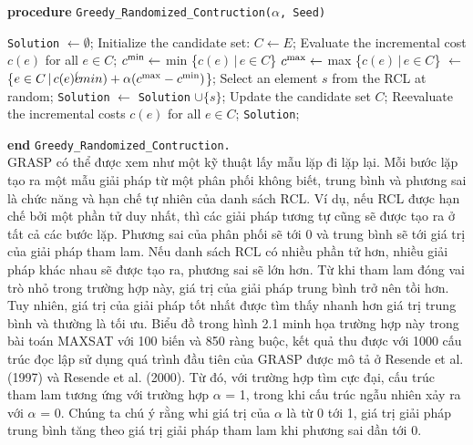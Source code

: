 \documentclass[14pt,a4paper]{report}
\begin{document}
{\bf procedure} \texttt{Greedy\_Randomized\_Contruction($\alpha$, Seed)}
\begin{algorithmic} [1] 
	\STATE \texttt{Solution} $\leftarrow \emptyset$;
	\STATE Initialize the candidate set: $C \leftarrow E$;
	\STATE Evaluate the incremental cost $c(e)$ for all $e \in C$;
	\STATE $c\textsuperscript{min} \leftarrow $ min \{$c(e)\,|\, e \in C$\}
	\STATE $c\textsuperscript{max} \leftarrow $ max \{$c(e)\,|\, e \in C$\}
	 $\leftarrow$ \{$e \in C\,|\, c(e) \lefteqn c\textsuperscript(min) + \alpha (c\textsuperscript{max} - c\textsuperscript{min})$\};
	\STATE Select an element $s$ from the RCL at random;
	\STATE \texttt{Solution} $\leftarrow$ \texttt{Solution} $\cup \{s\}$;
	\STATE Update the candidate set $C$;
	\STATE Reevaluate the incremental costs $c(e)$ for all $e \in C$;
	\ENDWHILE
	 \texttt{Solution};
\end{algorithmic}
{\bf end} \texttt{Greedy\_Randomized\_Contruction.}\\

GRASP có thể được xem như một kỹ thuật lấy mẫu lặp đi lặp lại. Mỗi bước lặp tạo ra một mẫu giải pháp từ một phân phối không biết, trung bình và phương sai là chức năng và hạn chế tự nhiên của danh sách RCL. Ví dụ, nếu RCL được hạn chế bởi một phần tử duy nhất, thì các giải pháp tương tự cũng sẽ được tạo ra ở tất cả các bước lặp. Phương sai của phân phối sẽ tới 0 và trung bình sẽ tới giá trị của giải pháp tham lam. Nếu danh sách RCL có nhiều phần tử hơn, nhiều giải pháp khác nhau sẽ được tạo ra, phương sai sẽ lớn hơn. Từ khi tham lam đóng vai trò nhỏ trong trường hợp này, giá trị của giải pháp trung bình trở nên tồi hơn. Tuy nhiên, giá trị của giải pháp tốt nhất được tìm thấy nhanh hơn giá trị trung bình và thường là tối ưu. Biểu đồ trong hình 2.1 minh họa trường hợp này trong bài toán MAXSAT với 100 biến và 850 ràng buộc, kết quả thu được với 1000 cấu trúc đọc lập sử dụng quá trình đầu tiên của GRASP được mô tả ở Resende et al. (1997) và Resende et al. (2000). Từ đó, với trường hợp tìm cực đại, cấu trúc tham lam tương ứng với trường hợp $\alpha$ = 1, trong khi cấu trúc ngẫu nhiên xảy ra với $\alpha$ = 0. Chúng ta chú ý rằng whi giá trị của $\alpha$ là từ 0 tới 1, giá trị giải pháp trung bình tăng theo giá trị giải pháp tham lam khi phương sai dần tới 0.\\
\end{document}
